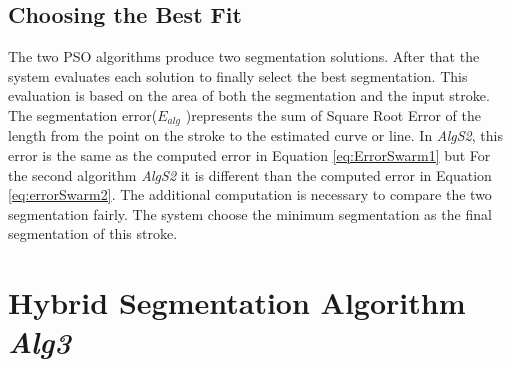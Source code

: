 \subsection{Choosing the Best Fit}
\label{sec:bestFit}
The two PSO algorithms produce two segmentation solutions. After that the system evaluates each solution to finally select the best segmentation. This evaluation is based on the area of both the segmentation and the input stroke. The segmentation error($E_{alg}$ )represents the sum of Square Root Error of the length from the point on the stroke to the estimated curve or line. In \textsl{AlgS2}, this error is the same as the computed error in Equation \ref{eq:ErrorSwarm1} but For the second algorithm \textsl{AlgS2} it is different than the computed error in Equation \ref{eq:errorSwarm2}. The additional computation is necessary to  compare the two segmentation fairly. The system choose the minimum segmentation as the final segmentation of this stroke. 
  
\section{Hybrid Segmentation Algorithm \textsl{Alg3}}
\label{sec:BenchMarckAlgorithm}

